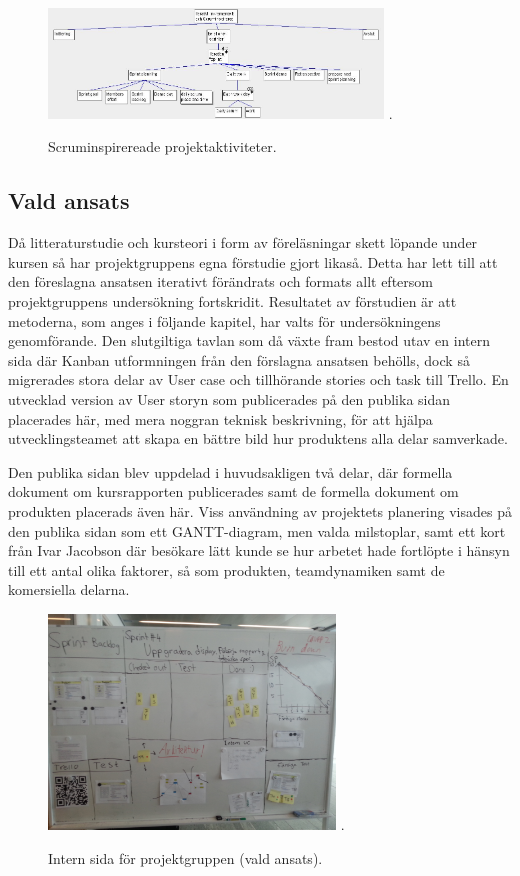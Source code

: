 \documentclass[conference,a4paper]{IEEEtran}
\begin{document}
\begin{figure}[H]
\centering
\includegraphics[width=3.5in]{scrum}
\DeclareGraphicsExtensions.
\caption{Scruminspirereade projektaktiviteter.}
\label{scruminspo}
\end{figure}

\subsection{Vald ansats}
Då litteraturstudie och kursteori i form av föreläsningar skett löpande under kursen så har projektgruppens egna förstudie gjort likaså. Detta har lett till att den föreslagna ansatsen iterativt förändrats och formats allt eftersom projektgruppens undersökning fortskridit.
Resultatet av förstudien är att metoderna, som anges i följande kapitel, har valts för undersökningens genomförande.
Den slutgiltiga tavlan som då växte fram bestod utav en intern sida där Kanban utformningen från den förslagna ansatsen behölls, dock så migrerades stora delar av User case och tillhörande stories och task till Trello. En utvecklad version av User storyn som publicerades på den publika sidan placerades här, med mera noggran teknisk beskrivning, för att hjälpa utvecklingsteamet att skapa en bättre bild hur produktens alla delar samverkade.

Den publika sidan blev uppdelad i huvudsakligen två delar, där formella dokument om kursrapporten publicerades samt de formella dokument om produkten placerads även här. Viss användning av projektets planering visades på den publika sidan som ett GANTT-diagram, men valda milstoplar, samt ett kort från Ivar Jacobson \cite{Jacobson11} där besökare lätt kunde se hur arbetet hade fortlöpte i hänsyn till ett antal olika faktorer, så som produkten, teamdynamiken samt de komersiella delarna.

\begin{figure}[H]
\centering
\includegraphics[width=3in]{varsprint}
\DeclareGraphicsExtensions.
\caption{Intern sida för projektgruppen (vald ansats).}
\label{varsprint}
\end{figure}
\end{document}

